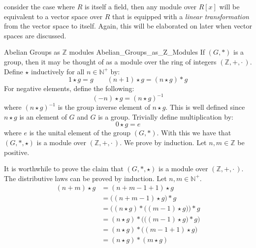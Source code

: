     consider the case where $R$ is itself a field, then any module over $R[x]$
    will be equivalent to a vector space over $R$ that is equipped with a
    \textit{linear transformation} from the vector space to itself. Again, this
    will be elaborated on later when vector spaces are discussed.
    \begin{fexample}{Abelian Groups as $\mathbb{Z}$ modules}
                    {Abelian_Groups_as_Z_Modules}
        If $(G,*)$ is a group, then it may be thought of as a module over the
        ring of integers $(\mathbb{Z},+,\cdot\,)$. Define $\star$ inductively
        for all $n\in\mathbb{N}^{+}$ by:
        \begin{equation}
            1\star{g}=g
            \quad\quad
            (n+1)\star{g}=(n\star{g})*g
        \end{equation}
        For negative elements, define the following:
        \begin{equation}
            (\minus{n})\star{g}=(n\star{g})^{\minus{1}}
        \end{equation}
        where $(n\star{g})^{\minus{1}}$ is the group inverse element of
        $n\star{g}$. This is well defined since $n\star{g}$ is an element of $G$
        and $G$ is a group. Trivially define multiplication by:
        \begin{equation}
            0\star{g}=e
        \end{equation}
        where $e$ is the unital element of the group $(G,*)$. With this we have
        that $(G,*,\star)$ is a module over $(\mathbb{Z},+,\cdot\,)$. We prove
        by induction. Let $n,m\in\mathbb{Z}$ be positive.
    \end{fexample}
    It is worthwhile to prove the claim that $(G,*,\star)$ is a module over
    $(\mathbb{Z},+,\cdot\,)$. The distributive laws can be proved by induction.
    Let $n,m\in\mathbb{N}^{+}$.
    \begin{subequations}
        \begin{align}
            (n+m)\star{g}
            &=(n+m-1+1)\star{g}\\
            &=\big((n+m-1)\star{g}\big)*g\\
            &=\Big((n\star{g})*\big((m-1)\star{g}\big)\Big)*g\\
            &=(n\star{g})*\Big(\big((m-1)\star{g})*g\Big)\\
            &=(n\star{g})*\big((m-1+1)\star{g}\big)\\
            &=(n\star{g})*(m\star{g})
        \end{align}
    \end{subequations}
